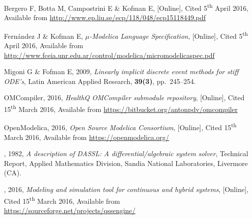 \documentclass[10pt]{article}
\begin{document}
{\footnotesize
\begin{thebibliography}{10}

 {\sc Bergero F, Botta M, Campostrini E \& Kofman E}, [Online], Cited 5\textsuperscript{th} April 2016, Available from {\url{http://www.ep.liu.se/ecp/118/048/ecp15118449.pdf}}

 {\sc Fern\'andez J \& Kofman E}, {\em $\mu$-Modelica Language Specification}, [Online], Cited 5\textsuperscript{th} April 2016, Available from {\url{http://www.fceia.unr.edu.ar/control/modelica/micromodelicaspec.pdf}}

 {\sc Migoni G \& Fofman E}, 2009, {\em Linearly implicit discrete event methods for stiff ODE's}, Latin American Applied Research, {\bf{39(3)}}, pp.\, 245--254.

 {\sc OMCompiler}, 2016, {\em HealthQ OMCompiler submodule repository}, [Online], Cited 15\textsuperscript{th} March 2016, Available from {\url{https://bitbucket.org/antonpdv/omcompiler}}

 {\sc OpenModelica}, 2016, {\em Open Source Modelica Consortium}, [Online], Cited 15\textsuperscript{th} March 2016, Available from {\url{https://openmodelica.org/}}

, 1982, {\em A description of DASSL: A differential/algebraic system solver}, Technical Report, Applied Mathematics Division, Sandia National Laboratories, Livermore (CA).

, 2016, {\em Modeling and simulation tool for continuous and hybrid systems}, [Online], Cited 15\textsuperscript{th} March 2016, Available from {\url{https://sourceforge.net/projects/qssengine/}}



\end{thebibliography}}
\end{document}

